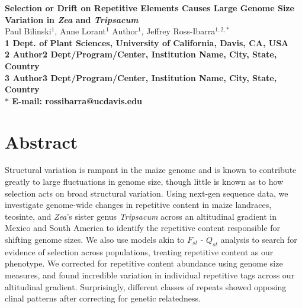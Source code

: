 \documentclass[10pt]{article}
\date{}
\begin{document}
\begin{flushleft}
{\Large
\textbf{Selection or Drift on Repetitive Elements Causes Large Genome Size Variation in \emph{Zea} and \emph{Tripsacum}}
}
\\
Paul Bilinski$^{1}$, 
Anne Lorant$^{1}$
Author$^{1}$, 
Jeffrey Ross-Ibarra$^{1,2,\ast}$
\\
\bf{1} Dept. of Plant Sciences, University of California, Davis, CA, USA
\\
\bf{2} Author2 Dept/Program/Center, Institution Name, City, State, Country
\\
\bf{3} Author3 Dept/Program/Center, Institution Name, City, State, Country
\\
$\ast$ E-mail: rossibarra@ucdavis.edu
\end{flushleft}

\section*{Abstract}

Structural variation is rampant in the maize genome and is known to contribute greatly to large fluctuations in genome size, though little is known as to how selection acts on broad structural variation.
Using next-gen sequence data, we investigate genome-wide changes in repetitive content in maize landraces, teosinte, and \emph{Zea}'s sister genus \emph{Tripsacum} across an altitudinal gradient in Mexico and South America to identify the repetitive content responsible for shifting genome sizes.
We also use models akin to $F_{st}$ - $Q_{st}$  analysis to search for evidence of selection across populations, treating repetitive content as our phenotype.
We corrected for repetitive content abundance using genome size measures, and found incredible variation in individual repetitive tags across our altitudinal gradient.
Surprisingly, different classes of repeats showed opposing clinal patterns after correcting for genetic relatedness.
\end{document}
